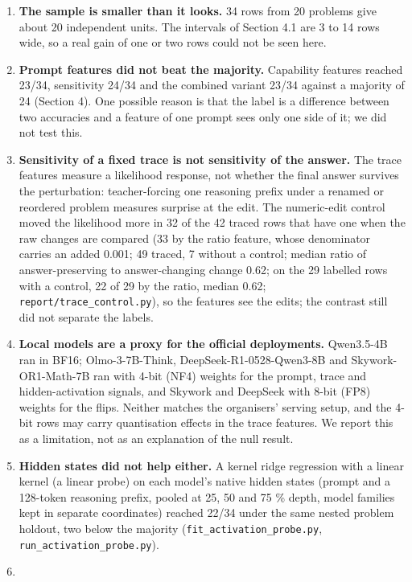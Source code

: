 \documentclass{article}
\begin{document}
\begin{enumerate}
\def\labelenumi{\arabic{enumi}.}
\item
  \textbf{The sample is smaller than it looks.} 34 rows from 20 problems give about 20 independent
  units. The intervals of Section 4.1 are 3 to 14 rows wide, so a real gain of one or two
  rows could not be seen here.
\item
  \textbf{Prompt features did not beat the majority.} Capability features reached 23/34, sensitivity
  24/34 and the combined variant 23/34 against a majority of 24 (Section 4). One possible reason is that
  the label is a difference between two accuracies and a feature of one prompt sees only one side
  of it; we did not test this.
\item
  \textbf{Sensitivity of a fixed trace is not sensitivity of the answer.} The trace features measure a
  likelihood response, not whether the final answer survives the perturbation: teacher-forcing
  one reasoning prefix under a renamed or reordered problem measures surprise at the edit. The numeric-edit control moved the likelihood more in 32 of the 42
  traced rows that have one when the raw changes are compared (33 by the ratio feature, whose denominator carries an added 0.001; 49 traced, 7 without a control; median ratio of
  answer-preserving to answer-changing change 0.62; on the 29 labelled rows with a control, 22 of
  29 by the ratio, median 0.62; \texttt{report/trace\_control.py}), so the features see the edits; the contrast still did not separate the labels.
\item
  \textbf{Local models are a proxy for the official deployments.} Qwen3.5-4B ran in BF16; Olmo-3-7B-Think,
  DeepSeek-R1-0528-Qwen3-8B and Skywork-OR1-Math-7B ran with 4-bit (NF4) weights for the prompt, trace and hidden-activation signals, and Skywork and DeepSeek with 8-bit (FP8) weights for the flips. Neither matches the
  organisers' serving setup, and the 4-bit rows may carry quantisation effects in the trace
  features. We report this as a limitation, not as an explanation of the null result.
\item
  \textbf{Hidden states did not help either.} A kernel ridge regression with a linear kernel (a linear probe) on each model's native hidden
  states (prompt and a 128-token reasoning prefix, pooled at 25, 50 and 75 \% depth, model families kept
  in separate coordinates) reached 22/34 under the same nested problem holdout, two below the
  majority (\texttt{fit\_activation\_probe.py}, \texttt{run\_activation\_probe.py}).
\item

\end{enumerate}
\end{document}
